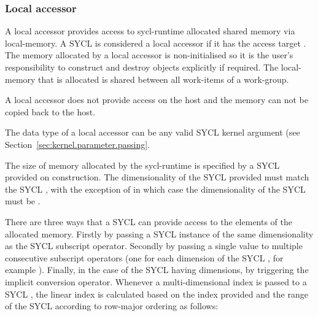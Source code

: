 
\subsubsection{Local accessor}
\label{sub.section.accessors.local}

A local accessor provides access to \gls{sycl-runtime} allocated shared memory via
\gls{local-memory}. A SYCL  is considered a local accessor
if it has the access target .
The memory allocated by a local accessor is non-initialised
so it is the user's responsibility to construct and destroy objects explicitly
if required. The \gls{local-memory} that is allocated is shared between
all \glspl{work-item} of a \gls{work-group}.

A local accessor does not provide access on the \gls{host} and the
memory can not be copied back to the \gls{host}.

The data type of a local accessor can be any valid SYCL kernel argument (see
Section~\ref{sec:kernel.parameter.passing}.

The size of memory allocated by the \gls{sycl-runtime} is specified by a SYCL
 provided on construction. The dimensionality of the SYCL
 provided must match the SYCL , with the
exception of  in which case the dimensionality of the SYCL
 must be .

There are three ways that a SYCL  can provide access to the
elements of the allocated memory. Firstly by passing a SYCL  instance of the same dimensionality as the SYCL 
subscript operator. Secondly by passing a single  value to
multiple consecutive subscript operators (one for each dimension of the SYCL
, for example ). Finally, in the
case of the SYCL  having  dimensions, by
triggering the implicit conversion operator. Whenever a multi-dimensional index
is passed to a SYCL , the linear index is calculated based
on the index  provided and the range of the SYCL 
  according to row-major
ordering as follows:

